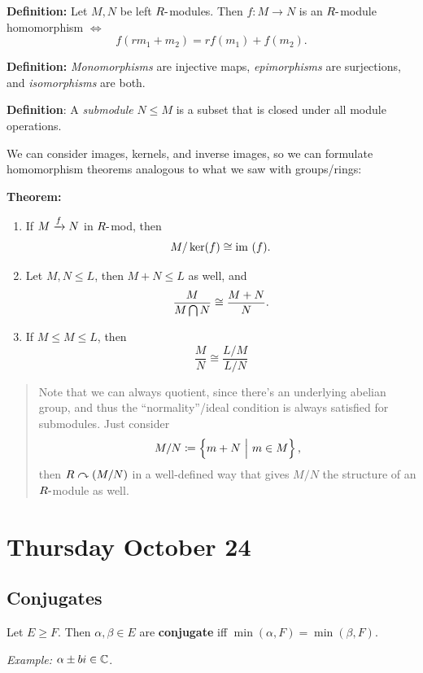 \textbf{Definition:} Let \(M, N\) be left \(R{\hbox{-}}\)modules. Then
\(f: M \to N\) is an \(R{\hbox{-}}\)module homomorphism \(\iff\) \[
f(rm_1 + m_2) = rf(m_1) + f(m_2)
.\]

\textbf{Definition:} \emph{Monomorphisms} are injective maps,
\emph{epimorphisms} are surjections, and \emph{isomorphisms} are both.

\textbf{Definition}: A \emph{submodule} \(N\leq M\) is a subset that is
closed under all module operations.

We can consider images, kernels, and inverse images, so we can formulate
homomorphism theorems analogous to what we saw with groups/rings:

\textbf{Theorem:}

\begin{enumerate}
\def\labelenumi{\arabic{enumi}.}
\item
  If \(M \xrightarrow{f} N\) in \(R{\hbox{-}}\)mod, then \[
  M / \ker(f) \cong {\text{im}~}(f)
  .\]
\item
  Let \(M, N \leq L\), then \(M+N \leq L\) as well, and \[
  \frac{M}{M\bigcap N} \cong \frac{M+N}{N}
  .\]
\item
  If \(M\leq M\leq L\), then \[
  \frac{M}{N} \cong \frac{L/M}{L/N}
  \]
\end{enumerate}

\begin{quote}
Note that we can always quotient, since there's an underlying abelian
group, and thus the ``normality''/ideal condition is always satisfied
for submodules. Just consider \[
M/N  \coloneqq \left\{{m + N {~\mathrel{\Big|}~} m\in M}\right\}
,\] then \(R\curvearrowright (M/N)\) in a well-defined way that gives \(M/N\) the
structure of an \(R{\hbox{-}}\)module as well.
\end{quote}

\hypertarget{thursday-october-24}{%
\section{Thursday October 24}\label{thursday-october-24}}

\hypertarget{conjugates}{%
\subsection{Conjugates}\label{conjugates}}

Let \(E\geq F\). Then \(\alpha, \beta \in E\) are \textbf{conjugate} iff
\(\min(\alpha, F) = \min(\beta, F)\).

\emph{Example:} \(\alpha \pm bi \in {\mathbb{C}}\).

